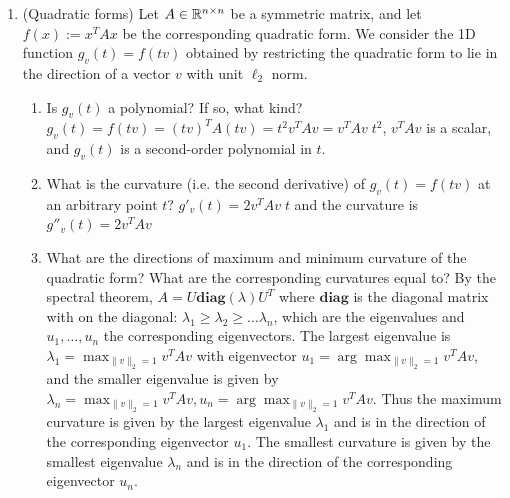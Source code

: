 \documentclass[12pt,twoside]{article}
\begin{document}
\begin{enumerate}
\item (Quadratic forms) Let $A\in \mathbb{R}^{n \times n}$ be a symmetric matrix, and let $f(x):=x^TAx$ be the corresponding quadratic form. We consider the 1D function $g_{v}(t)=f(tv)$ obtained by restricting the quadratic form to lie in the direction of a vector $v$ with unit $\ell_2$ norm.
\begin{enumerate}
\item Is $g_{v}(t)$ a polynomial? If so, what kind?
	$g_{v}(t) = f(tv) = (tv)^T A (tv) = t^2 v^T A v = v^T A v \; t^2$, $v^T A v$ is a scalar, and $g_{v}(t)$ is a second-order polynomial in $t$. 
\item What is the curvature (i.e. the second derivative) of $g_{v}(t)=f(tv)$ at an arbitrary point $t$?
$g'_{v}(t)= 2 v^T A v \; t$ and the curvature is $g''_{v}(t)= 2 v^T A v$

\item What are the directions of maximum and minimum curvature of the quadratic form? What are the corresponding curvatures equal to?
By the spectral theorem, $A = U \textbf{diag}(\lambda) U^T$ where $\textbf{diag}$ is the diagonal matrix with on the diagonal: $\lambda_1 \ge \lambda_2 \ge \ldots \lambda_n$, which are the eigenvalues and $u_1, \dots, u_n$ the corresponding eigenvectors. The largest eigenvalue is
$\lambda_1 = \max_{\|v\|_2 =1} v^T A v$ with eigenvector $u_1 = \arg \max_{\|v\|_2 =1} v^T A v$, and the smaller eigenvalue  is given by $\lambda_n = \max_{\|v\|_2 =1} v^T A v, u_n = \arg \max_{\|v\|_2 =1} v^T A v$. Thus the maximum curvature is given by the largest eigenvalue $\lambda_1$ and  is in the direction of the corresponding eigenvector $u_1$. 
	The smallest curvature is  given  by  the  smallest  eigenvalue $\lambda_n$ and is in the direction of the corresponding eigenvector $u_n$.

\end{enumerate}


\end{enumerate}
\end{document}
